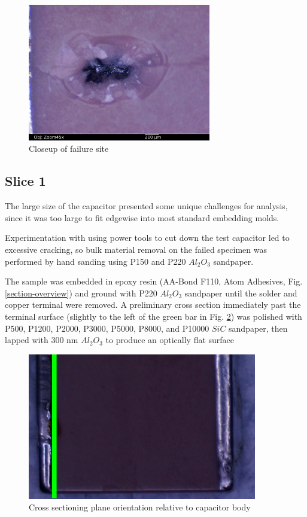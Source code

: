 \documentclass{article}
\begin{document}
\begin{figure}[h]
\includegraphics[width=8cm,keepaspectratio]{03-badcap-side_annotated.jpg}
\caption{Closeup of failure site}
\label{fail-closeup}
\end{figure}

\FloatBarrier

\subsection{Slice 1}

The large size of the capacitor presented some unique challenges for analysis, since it was too large to fit edgewise
into most standard embedding molds.

Experimentation with using power tools to cut down the test capacitor led to excessive cracking, so bulk material
removal on the failed specimen was performed by hand sanding using P150 and P220 $Al_2O_3$ sandpaper.

The sample was embedded in epoxy resin (AA-Bond F110, Atom Adhesives, Fig.\ref{section-overview}) and ground with P220
$Al_2O_3$ sandpaper until the solder and copper terminal were removed. A preliminary cross section immediately past the
terminal surface (slightly to the left of the green bar in Fig. \ref{section-plane}) was polished with P500, P1200,
P2000, P3000, P5000, P8000, and P10000 $SiC$ sandpaper, then lapped with 300 nm $Al_2O_3$ to produce an optically flat
surface

\begin{figure}[h]
\includegraphics[width=10cm,keepaspectratio]{section-plane.jpg}
\caption{Cross sectioning plane orientation relative to capacitor body}
\label{section-plane}
\end{figure}
\end{document}
